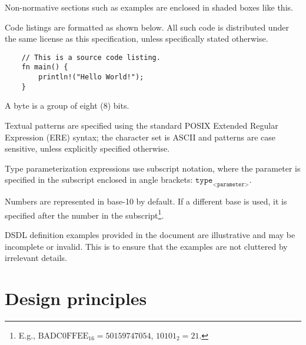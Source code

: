 \begin{remark}
    Non-normative sections such as examples are enclosed in shaded boxes like this.
\end{remark}

Code listings are formatted as shown below.
All such code is distributed under the same license as this specification, unless specifically stated otherwise.

\begin{verbatim}
    // This is a source code listing.
    fn main() {
        println!("Hello World!");
    }
\end{verbatim}

A byte is a group of eight (8) bits.

Textual patterns are specified using the standard
POSIX Extended Regular Expression (ERE) syntax;
the character set is ASCII and patterns are case sensitive, unless explicitly specified otherwise.

Type parameterization expressions use subscript notation,
where the parameter is specified in the subscript enclosed in angle brackets:
$\texttt{type}_\texttt{<parameter>}$.

Numbers are represented in base-10 by default.
If a different base is used, it is specified after the number in the subscript\footnote{%
    E.g., $\text{BADC0FFEE}_{16} = 50159747054$, $10101_2 = 21$.
}.

DSDL definition examples provided in the document are illustrative and may be incomplete or invalid.
This is to ensure that the examples are not cluttered by irrelevant details.

\section{Design principles}

